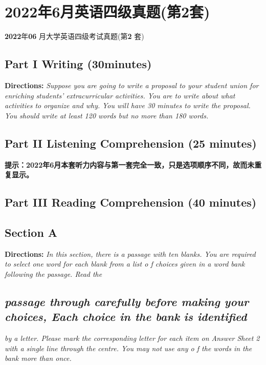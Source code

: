 \documentclass[UTF8,11pt]{ctexart}
\begin{document}
\section*{2022年6月英语四级真题(第2套)}
\textbf{2022}年\textbf{06} 月大学英语四级考试真题(第\textbf{2} 套)


\subsection*{\textbf{Part I} \textbf{Writing} \textbf{(30minutes)}}


\textbf{Directions: }\textit{Suppose you are going to write a proposal to your student union for enriching} \textit{students' extracurricular activities. You are to write about what activities to organize and why.} \textit{You will have 30 minutes to write the proposal. You should write at least 120 words but no more} \textit{than 180 words.}


\subsection*{\textbf{Part II} \textbf{Listening Comprehension} \textbf{(25 minutes)}}


\textbf{提示：2022年6月本套听力内容与第一套完全一致，只是选项顺序不同，故而未重复显示。}


\subsection*{\textbf{Part III} \textbf{Reading Comprehension} \textbf{(40 minutes)}}


\subsection*{\textbf{Section A}}


\textbf{Directions: }\textit{In this section, there is a passage with ten blanks. You are required to select one} \textit{word for each blank from a list o f choices given in a word bank following the passage. Read the}


\subsection*{\textit{passage through carefully before making your choices, Each choice in the bank} \textit{is identified}}


\textit{by a letter. Please mark the corresponding letter for each item on Answer Sheet 2 with a single} \textit{line through the centre. You may not use any o f the words in the bank more than once.}
\end{document}
